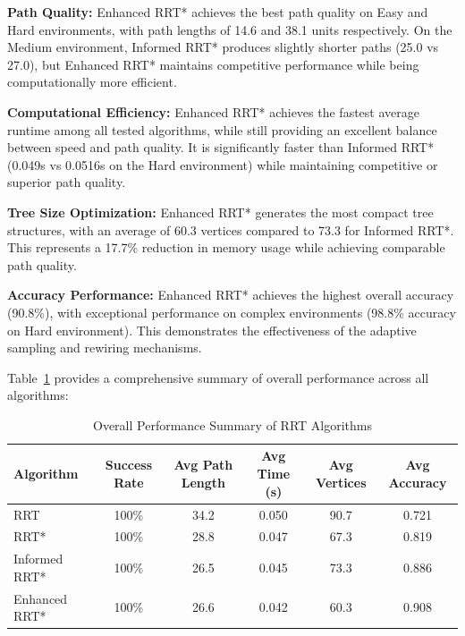 \documentclass[pdflatex,sn-mathphys-num]{sn-jnl}
\theoremstyle{thmstyleone}%
\theoremstyle{thmstyletwo}%
\theoremstyle{thmstylethree}%
\begin{document}
{
\setlength{\parindent}{0pt}
\textbf{Path Quality:} Enhanced RRT* achieves the best path quality on Easy and Hard environments, with path lengths of 14.6 and 38.1 units respectively. On the Medium environment, Informed RRT* produces slightly shorter paths (25.0 vs 27.0), but Enhanced RRT* maintains competitive performance while being computationally more efficient.

\textbf{Computational Efficiency:} Enhanced RRT* achieves the fastest average runtime among all tested algorithms, while still providing an excellent balance between speed and path quality.  It is significantly faster than Informed RRT* (0.049s vs 0.0516s on the Hard environment) while maintaining competitive or superior path quality.


\textbf{Tree Size Optimization:} Enhanced RRT* generates the most compact tree structures, with an average of 60.3 vertices compared to 73.3 for Informed RRT*. This represents a 17.7\% reduction in memory usage while achieving comparable path quality.

\textbf{Accuracy Performance:} Enhanced RRT* achieves the highest overall accuracy (90.8\%), with exceptional performance on complex environments (98.8\% accuracy on Hard environment). This demonstrates the effectiveness of the adaptive sampling and rewiring mechanisms.}

Table~\ref{tab:rrt_summary} provides a comprehensive summary of overall performance across all algorithms:

\begin{table}[htbp]
\centering
\caption{Overall Performance Summary of RRT Algorithms}
\label{tab:rrt_summary}
\begin{tabular}{lccccc}
\toprule
Algorithm & Success Rate & Avg Path Length & Avg Time (s) & Avg Vertices & Avg Accuracy \\
\midrule
RRT & 100\% & 34.2 & 0.050 & 90.7 & 0.721 \\
RRT* & 100\% & 28.8 & 0.047 & 67.3 & 0.819 \\
Informed RRT* & 100\% & 26.5 & 0.045 & 73.3 & 0.886 \\
Enhanced RRT* & 100\% & 26.6 & 0.042 & 60.3 & 0.908 \\
\bottomrule
\end{tabular}
\end{table}
\end{document}
